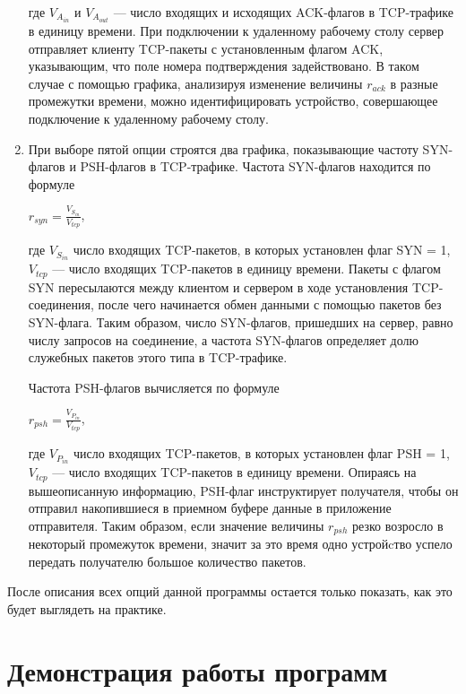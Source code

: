 \documentclass[bachelor, och, coursework]{SCWorks}
\begin{document}
\begin{enumerate}
    где $V_{A_{in}}$ и $V_{A_{out}}$ --- число входящих и исходящих ACK-флагов в TCP-трафике в единицу времени. При подключении к удаленному рабочему 
    столу сервер отправляет клиенту TCP-пакеты с установленным флагом ACK, указывающим, что поле номера подтверждения задействовано. В таком случае с
    помощью графика, анализируя изменение величины $r_{ack}$ в разные промежутки времени, можно идентифицировать устройство, совершающее подключение
    к удаленному рабочему столу.
    \item При выборе пятой опции строятся два графика, показывающие частоту SYN-флагов и PSH-флагов в TCP-трафике. Частота SYN-флагов находится по формуле
    
    \begin{center}
      $r_{syn} = \frac{V_{S_{in}}}{V_{tcp}}$,
    \end{center}

    где $V_{S_{in}}$ число входящих TCP-пакетов, в которых установлен флаг SYN = 1, $V_{tcp}$ --- число входящих TCP-пакетов в единицу времени.
    Пакеты с флагом SYN пересылаются между клиентом и сервером в ходе установления TCP-соединения, после чего начинается обмен данными с
    помощью пакетов без SYN-флага. Таким образом, число SYN-флагов, пришедших на сервер, равно числу запросов на соединение, а частота
    SYN-флагов определяет долю служебных пакетов этого типа в TCP-трафике.

    Частота PSH-флагов вычисляется по формуле 
    
    \begin{center}
      $r_{psh} = \frac{V_{P_{in}}}{V_{tcp}}$,
    \end{center}
    
    где $V_{P_{in}}$ число входящих TCP-пакетов, в которых установлен флаг PSH = 1, $V_{tcp}$ --- число входящих TCP-пакетов в единицу времени.
    Опираясь на вышеописанную информацию, PSH-флаг инструктирует получателя, чтобы он отправил накопившиеся в приемном буфере данные в
    приложение отправителя. Таким образом, если значение величины $r_{psh}$ резко возросло в некоторый промежуток времени, значит за это время
    одно устройcтво успело передать получателю большое количество пакетов.
  \end{enumerate}

  После описания всех опций данной программы остается только показать, как это будет выглядеть на практике.

  \section{Демонстрация работы программ}
\end{document}
